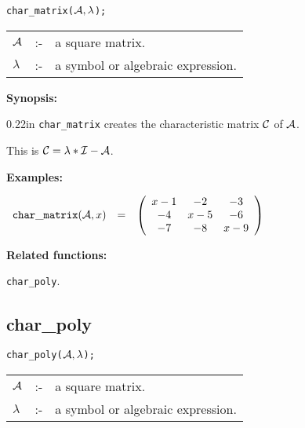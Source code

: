 \hspace*{0.175in} {\tt char\_matrix(${\cal A},\lambda$);}

\hspace*{0.1in} 
\begin{tabular}{l l l}
${\cal A}$ &:-& a square matrix. \\
$\lambda$  &:-& a symbol or algebraic expression. 
\end{tabular}

{\bf Synopsis:} %

\begin{addtolength}{\leftskip}{0.22in}
{\tt char\_matrix} creates the characteristic matrix ${\cal C}$ of 
${\cal A}$.

This is ${\cal C} = \lambda * {\cal I} - {\cal A}$. 

\end{addtolength}

{\bf Examples:}

\begin{flushleft}  
\hspace*{0.1in}
\begin{math}  
\begin{array}{ccc}
{\tt char\_matrix}({\cal A},x) & = & 
\left( \begin{array}{ccc} x-1 & -2 & -3 \\ -4 & x-5 & -6 \\ -7 & -8 & 
x-9 
\end{array} \right)  
\end{array}  
\end{math}  
\end{flushleft}

{\bf Related functions:}

\hspace*{0.175in} {\tt char\_poly}. 


\subsection{char\_poly}


\hspace*{0.175in} {\tt char\_poly(${\cal A},\lambda$);}

\hspace*{0.1in} 
\begin{tabular}{l l l}
${\cal A}$ &:-& a square matrix. \\
$\lambda$ &:-& a symbol or algebraic expression.
\end{tabular}

